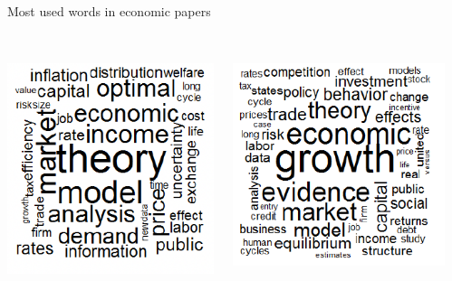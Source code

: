 \documentclass{./../div_teaching_slides}
\begin{document}
\begin{frame}{Most used words in economic papers}
\vspace{1.5em}
\begin{columns}
\begin{column}[c]{0.3\textwidth}
\centering
{} \\ \vspace{0.75em}
\includegraphics[scale=0.4]{1970.png}
\end{column}
\begin{column}[c]{0.3\textwidth}
\centering
{} \\ \vspace{0.75em}
\includegraphics[scale=0.4]{1990.png}
\end{column}
\begin{column}[c]{0.3\textwidth}
\centering
{} \\ \vspace{0.75em}

\end{column}
\end{columns}
\end{frame}
\end{document}
